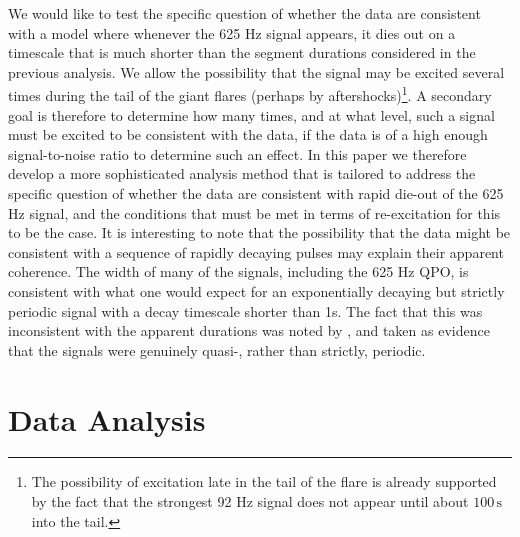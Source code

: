 \documentclass{emulateapj}
\begin{document}
We would like to test the specific question of whether the data are consistent with a model where whenever the 625 Hz signal appears, it dies out on a timescale that is much shorter than the segment durations considered in the previous analysis. We allow the possibility that the signal may be excited several times during the tail of the giant flares (perhaps by aftershocks)\footnote{The possibility of excitation late in the tail of the flare is already supported by the fact that the strongest 92 Hz signal does not appear until about $100\,\mathrm{s}$ into the tail.}. A secondary goal is therefore to determine how many times, and at what level, such a signal must be excited to be consistent with the data, if the data is of a high enough signal-to-noise ratio to determine such an effect. In this paper we therefore develop a more sophisticated analysis method that is tailored to address the specific question of whether the data are consistent with rapid die-out of the 625 Hz signal, and the conditions that must be met in terms of re-excitation for this to be the case. It is interesting to note that the possibility that the data might be consistent with a sequence of rapidly decaying pulses may explain their apparent coherence. The width of many of the signals, including the 625 Hz QPO, is consistent with what one would expect for an exponentially decaying but strictly periodic signal with a decay timescale shorter than 1s. The fact that this was inconsistent with the apparent durations was noted by \citet{Watts11}, and taken as evidence that the signals were genuinely quasi-, rather than strictly, periodic.

\section{Data Analysis \footnotemark[2]} 
\label{sec:analysis}
\end{document}
